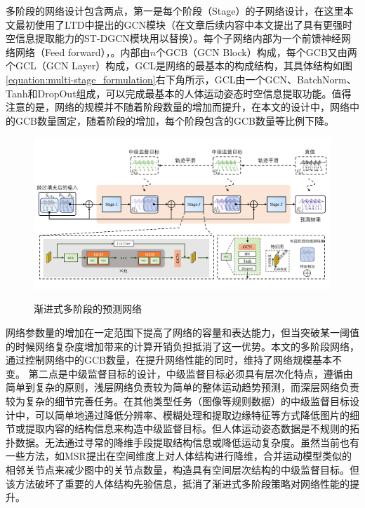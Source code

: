 多阶段的网络设计包含两点，第一是每个阶段（Stage）的子网络设计，在这里本文最初使用了LTD中提出的GCN模块（在文章后续内容中本文提出了具有更强时空信息提取能力的ST-DGCN模块用以替换）。每个子网络内部为一个前馈神经网络网络（Feed forward），。内部由$n$个GCB（GCN Block）构成，每个GCB又由两个GCL（GCN Layer）构成，GCL是网络的最基本的构成结构，其具体结构如图\ref{equation:multi-stage_formulation}右下角所示，GCL由一个GCN、BatchNorm、Tanh和DropOut组成，可以完成最基本的人体运动姿态时空信息提取功能。值得注意的是，网络的规模并不随着阶段数量的增加而提升，在本文的设计中，网络中的GCB数量固定，随着阶段的增加，每个阶段包含的GCB数量等比例下降。
\begin{figure}[ht]
    \centering
    \includegraphics[width=1\textwidth]{FigMa/multi-stage_network.png}\\
    \vspace{-0.3cm}
    \caption{渐进式多阶段的预测网络}
    \label{fig:multi_stage}
\end{figure}
网络参数量的增加在一定范围下提高了网络的容量和表达能力，但当突破某一阈值的时候网络复杂度增加带来的计算开销负担抵消了这一优势。本文的多阶段网络，通过控制网络中的GCB数量，在提升网络性能的同时，维持了网络规模基本不变。
第二点是中级监督目标的设计，中级监督目标必须具有层次化特点，遵循由简单到复杂的原则，浅层网络负责较为简单的整体运动趋势预测，而深层网络负责较为复杂的细节完善任务。在其他类型任务（图像等规则数据）的中级监督目标设计中，可以简单地通过降低分辨率、模糊处理和提取边缘特征等方式降低图片的细节或提取内容的结构信息来构造中级监督目标。但人体运动姿态数据是不规则的拓扑数据。无法通过寻常的降维手段提取结构信息或降低运动复杂度。虽然当前也有一些方法，如MSR\parencite{dang2021msr}提出在空间维度上对人体结构进行降维，合并运动模型类似的相邻关节点来减少图中的关节点数量，构造具有空间层次结构的中级监督目标。但该方法破坏了重要的人体结构先验信息，抵消了渐进式多阶段策略对网络性能的提升。

